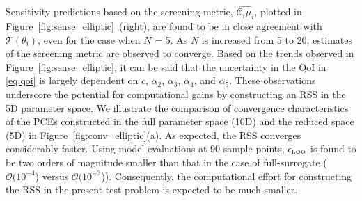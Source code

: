 %
Sensitivity predictions based on the screening metric, $\widehat{\mathcal{C}_i\mu_i}$,
plotted in Figure~\ref{fig:sense_elliptic}~(right), are found to
be in close agreement with $\mathcal{T}(\theta_i)$, even for the case when $N$ = 5. As $N$
is increased from 5 to 20, estimates of the screening metric are observed to converge.
Based on the trends observed in Figure~\ref{fig:sense_elliptic}, it can be said that
the uncertainty in the QoI in \eqref{eq:qoi} is largely dependent on $c$, 
$\alpha_2$, $\alpha_3$, $\alpha_4$, and $\alpha_5$. These observations underscore the
potential for computational gains by constructing an RSS in the 5D parameter space. We 
illustrate the comparison of convergence characteristics of the PCEs constructed in the
full parameter space (10D) and the reduced space (5D) in Figure~\ref{fig:conv_elliptic}(a). 
As expected, the RSS converges considerably faster. Using model evaluations at 90
sample points, $\epsilon_{\mbox{\tiny{LOO}}}$ is found to be two orders of magnitude
smaller than that in the case of full-surrogate ($\mathcal{O}(10^{-4}$) versus
$\mathcal{O}(10^{-2}$)). 
Consequently, the computational effort for constructing the RSS in the present test problem
is expected to be much smaller. 
%
